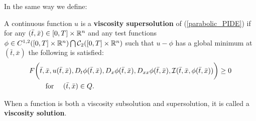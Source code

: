 \noindent
In the same way we define:
\begin{Definition}
 A continuous function $u$ is a \textbf{viscosity supersolution} of (\ref{parabolic_PIDE})
 if for any $(\bar t, \bar x) \in [0,T]\times \mathbb{R}^n$ and any test functions $ \phi \in C^{1,2}([0,T] \times \mathbb{R}^n) \bigcap \mathcal{C}_2([0,T] \times \mathbb{R}^n)$ 
 such that $u-\phi$ has a global minimum at $(\bar t,\bar x)$ the following is satisfied:
\begin{align}\label{supersolution}
 & F\biggl( \bar t,\bar x,u(\bar t,\bar x),D_t \phi(\bar t,\bar x), D_x \phi(\bar t,\bar x),D_{xx}\phi(\bar t,\bar x),\mathcal{I}(\bar t, \bar x,\phi(\bar t,\bar x))\biggr) \geq 0 \\ \nonumber
 &  \quad \quad \mbox{ for } \quad (\bar t,\bar x) \in Q.
\end{align}
\end{Definition}

\noindent
When a function is both a viscosity subsolution and supersolution, it is called a \textbf{viscosity solution}.

% 
